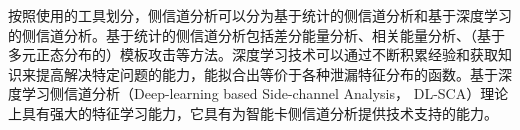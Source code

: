{	按照使用的工具划分，侧信道分析可以分为基于统计的侧信道分析和基于深度学习的侧信道分析。基于统计的侧信道分析包括差分能量分析、相关能量分析、（基于多元正态分布的）模板攻击等方法。深度学习技术可以通过不断积累经验和获取知识来提高解决特定问题的能力，能拟合出等价于各种泄漏特征分布的函数。基于深度学习侧信道分析（Deep-learning based Side-channel Analysis， DL-SCA）理论上具有强大的特征学习能力，它具有为智能卡侧信道分析提供技术支持的能力。
%	
%	
%	

}
